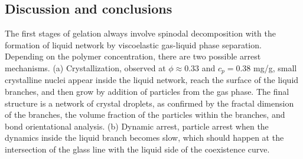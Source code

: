 \documentclass[preprint,amsmath,amssymb,superscriptaddress]{revtex4-1}
\begin{document}
% 

\subsection*{Discussion and conclusions}
The first stages of gelation always involve spinodal decomposition with the formation
of liquid network by viscoelastic gas-liquid phase separation. 
Depending on the polymer concentration, there are two possible arrest mechanisms. 
(a) Crystallization, observed at $\phi\approx 0.33$ and $c_p=0.38$ mg/g, small crystalline nuclei appear inside the liquid network, reach the surface 
 of the liquid branches, and then grow by addition of particles from the gas phase. The final structure is a network of crystal droplets,
 as confirmed by the fractal dimension of the branches, the volume fraction of the particles within the branches, and bond orientational analysis. 
(b) Dynamic arrest, particle arrest when the dynamics inside the liquid branch becomes slow, which should happen at the intersection of the
 glass line with the liquid side of the coexistence curve. 
\end{document}
